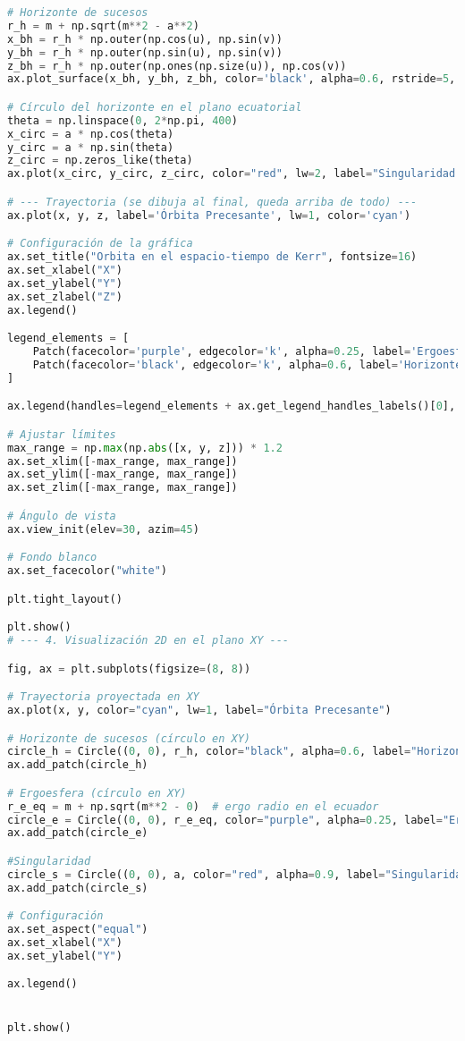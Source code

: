 \begin{lstlisting}[language=Python, caption=Programa para el calculo de las geodesicas en Kerr]
# Horizonte de sucesos
r_h = m + np.sqrt(m**2 - a**2)
x_bh = r_h * np.outer(np.cos(u), np.sin(v))
y_bh = r_h * np.outer(np.sin(u), np.sin(v))
z_bh = r_h * np.outer(np.ones(np.size(u)), np.cos(v))
ax.plot_surface(x_bh, y_bh, z_bh, color='black', alpha=0.6, rstride=5, cstride=5)

# Círculo del horizonte en el plano ecuatorial
theta = np.linspace(0, 2*np.pi, 400)
x_circ = a * np.cos(theta)
y_circ = a * np.sin(theta)
z_circ = np.zeros_like(theta)
ax.plot(x_circ, y_circ, z_circ, color="red", lw=2, label="Singularidad r=a")

# --- Trayectoria (se dibuja al final, queda arriba de todo) ---
ax.plot(x, y, z, label='Órbita Precesante', lw=1, color='cyan')

# Configuración de la gráfica
ax.set_title("Orbita en el espacio-tiempo de Kerr", fontsize=16)
ax.set_xlabel("X")
ax.set_ylabel("Y")
ax.set_zlabel("Z")
ax.legend()

legend_elements = [
    Patch(facecolor='purple', edgecolor='k', alpha=0.25, label='Ergoesfera'),
    Patch(facecolor='black', edgecolor='k', alpha=0.6, label='Horizonte de sucesos'),
]

ax.legend(handles=legend_elements + ax.get_legend_handles_labels()[0], loc="upper right")

# Ajustar límites
max_range = np.max(np.abs([x, y, z])) * 1.2
ax.set_xlim([-max_range, max_range])
ax.set_ylim([-max_range, max_range])
ax.set_zlim([-max_range, max_range])

# Ángulo de vista
ax.view_init(elev=30, azim=45)

# Fondo blanco
ax.set_facecolor("white")

plt.tight_layout()

plt.show()
# --- 4. Visualización 2D en el plano XY ---

fig, ax = plt.subplots(figsize=(8, 8))

# Trayectoria proyectada en XY
ax.plot(x, y, color="cyan", lw=1, label="Órbita Precesante")

# Horizonte de sucesos (círculo en XY)
circle_h = Circle((0, 0), r_h, color="black", alpha=0.6, label="Horizonte de sucesos")
ax.add_patch(circle_h)

# Ergoesfera (círculo en XY)
r_e_eq = m + np.sqrt(m**2 - 0)  # ergo radio en el ecuador
circle_e = Circle((0, 0), r_e_eq, color="purple", alpha=0.25, label="Ergoesfera")
ax.add_patch(circle_e)

#Singularidad
circle_s = Circle((0, 0), a, color="red", alpha=0.9, label="Singularidad", fill=False)
ax.add_patch(circle_s)

# Configuración
ax.set_aspect("equal")
ax.set_xlabel("X")
ax.set_ylabel("Y")

ax.legend()


plt.show()
\end{lstlisting}

